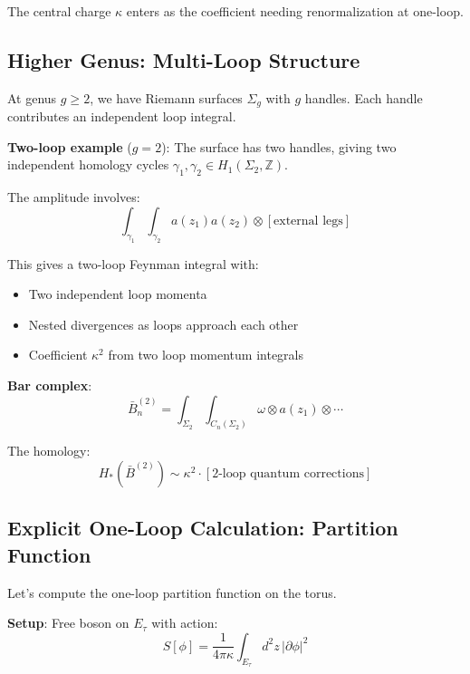 The central charge $\kappa$ enters as the coefficient needing renormalization at one-loop.

\subsection{Higher Genus: Multi-Loop Structure}

At genus $g \geq 2$, we have Riemann surfaces $\Sigma_g$ with $g$ handles. Each handle contributes an independent loop integral.

\textbf{Two-loop example} ($g=2$): The surface has two handles, giving two independent homology cycles $\gamma_1, \gamma_2 \in H_1(\Sigma_2, \mathbb{Z})$.

The amplitude involves:
\begin{equation}
\int_{\gamma_1} \int_{\gamma_2} a(z_1) a(z_2) \otimes [\text{external legs}]
\end{equation}

This gives a two-loop Feynman integral with:
\begin{itemize}
\item Two independent loop momenta
\item Nested divergences as loops approach each other
\item Coefficient $\kappa^2$ from two loop momentum integrals
\end{itemize}

\textbf{Bar complex}:
\begin{equation}
\bar{B}^{(2)}_n = \int_{\Sigma_2} \int_{C_n(\Sigma_2)} \omega \otimes a(z_1) \otimes \cdots
\end{equation}

The homology:
\begin{equation}
H_*(\bar{B}^{(2)}) \sim \kappa^2 \cdot [\text{2-loop quantum corrections}]
\end{equation}

\subsection{Explicit One-Loop Calculation: Partition Function}

Let's compute the one-loop partition function on the torus.

\textbf{Setup}: Free boson on $E_\tau$ with action:
\begin{equation}
S[\phi] = \frac{1}{4\pi\kappa} \int_{E_\tau} d^2z \, |\partial \phi|^2
\end{equation}

